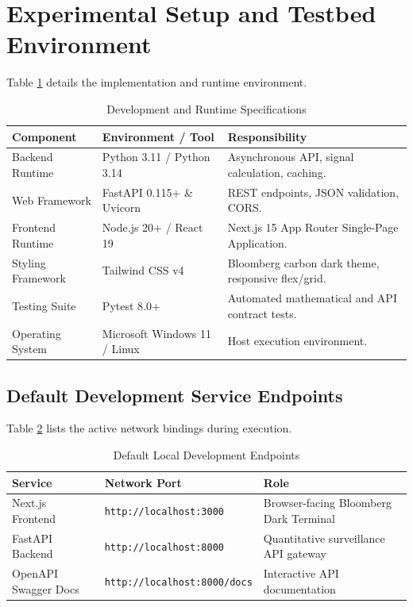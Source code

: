 \section{Experimental Setup and Testbed Environment}
Table \ref{tab:dev_environment} details the implementation and runtime environment.

\begin{table}[H]
\centering
\caption{Development and Runtime Specifications}
\label{tab:dev_environment}
\begin{tabularx}{\textwidth}{@{}llX@{}}
\toprule
\textbf{Component} & \textbf{Environment / Tool} & \textbf{Responsibility} \\
\midrule
Backend Runtime & Python 3.11 / Python 3.14 & Asynchronous API, signal calculation, caching. \\
Web Framework & FastAPI 0.115+ \& Uvicorn & REST endpoints, JSON validation, CORS. \\
Frontend Runtime & Node.js 20+ / React 19 & Next.js 15 App Router Single-Page Application. \\
Styling Framework & Tailwind CSS v4 & Bloomberg carbon dark theme, responsive flex/grid. \\
Testing Suite & Pytest 8.0+ & Automated mathematical and API contract tests. \\
Operating System & Microsoft Windows 11 / Linux & Host execution environment. \\
\bottomrule
\end{tabularx}
\end{table}

\subsection{Default Development Service Endpoints}
Table \ref{tab:endpoints} lists the active network bindings during execution.

\begin{table}[H]
\centering
\caption{Default Local Development Endpoints}
\label{tab:endpoints}
\begin{tabular}{lll}
\toprule
\textbf{Service} & \textbf{Network Port} & \textbf{Role} \\
\midrule
Next.js Frontend & \texttt{http://localhost:3000} & Browser-facing Bloomberg Dark Terminal \\
FastAPI Backend & \texttt{http://localhost:8000} & Quantitative surveillance API gateway \\
OpenAPI Swagger Docs & \texttt{http://localhost:8000/docs} & Interactive API documentation \\
\bottomrule
\end{tabular}
\end{table}


